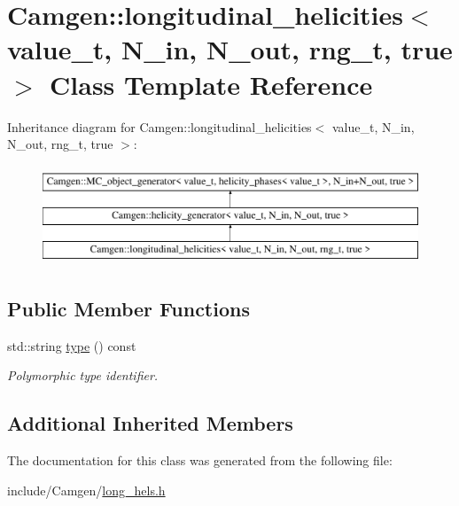 \hypertarget{a00329}{\section{Camgen\-:\-:longitudinal\-\_\-helicities$<$ value\-\_\-t, N\-\_\-in, N\-\_\-out, rng\-\_\-t, true $>$ Class Template Reference}
\label{a00329}
}
Inheritance diagram for Camgen\-:\-:longitudinal\-\_\-helicities$<$ value\-\_\-t, N\-\_\-in, N\-\_\-out, rng\-\_\-t, true $>$\-:\begin{figure}[H]
\begin{center}
\leavevmode
\includegraphics[height=3.000000cm]{a00329}
\end{center}
\end{figure}
\subsection*{Public Member Functions}
\begin{DoxyCompactItemize}
\item 
\hypertarget{a00329_ac72175ee3d4999418bd16fce123d23c4}{std\-::string \hyperlink{a00329_ac72175ee3d4999418bd16fce123d23c4}{type} () const }\label{a00329_ac72175ee3d4999418bd16fce123d23c4}

\begin{DoxyCompactList}\small\item\em Polymorphic type identifier. \end{DoxyCompactList}\end{DoxyCompactItemize}
\subsection*{Additional Inherited Members}


The documentation for this class was generated from the following file\-:\begin{DoxyCompactItemize}
\item 
include/\-Camgen/\hyperlink{a00662}{long\-\_\-hels.\-h}\end{DoxyCompactItemize}

